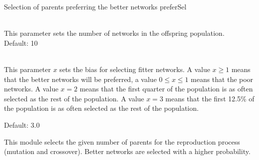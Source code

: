 \begin{moduledoc}{Selection of  parents preferring the better networks}
                 {preferSel}
  \item[\KeyWord{gensize} \optParam{ gen } ]~\\
  This parameter sets the number of networks in the offspring population.\\
   Default: 10
  \item[\KeyWord{preferfactor} \optParam{ x } ]~\\
  This parameter $x$ sets the bias for selecting fitter networks.
  A value $x \ge 1$ means that the better networks will be preferred,   
  a value $0 \le x\le 1$ means that the poor networks.
  A value $x = 2$ means that the first quarter of the population is as
  often selected as the rest of the population.
  A value $x = 3$ means that the first 12.5\% of the population is as
  often selected as the rest of the population.

    Default: 3.0 
\end{moduledoc}

This  module selects the given number of  parents for the reproduction process
(mutation and crossover).
Better networks are selected with a higher probability. 

